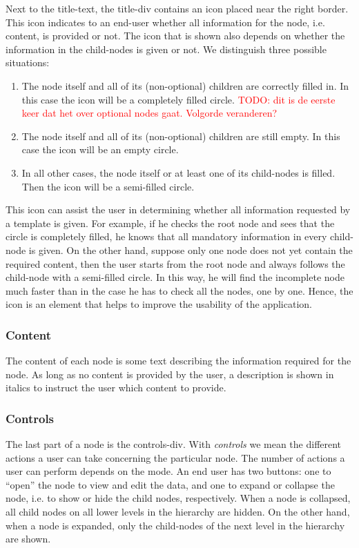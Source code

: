 Next to the title-text, the title-div contains an icon placed near the right border. This icon indicates to an end-user whether all information for the node, i.e. content, is provided or not. The icon that is shown also depends on whether the information in the child-nodes is given or not. We distinguish three possible situations:
\begin{enumerate}
	\item The node itself and all of its (non-optional) children are correctly filled in. In this case the icon will be a completely filled circle. \textcolor{red}{TODO: dit is de eerste keer dat het over optional nodes gaat. Volgorde veranderen?}
	\item The node itself and all of its (non-optional) children are still empty. In this case the icon will be an empty circle.
	\item In all other cases, the node itself or at least one of its child-nodes is filled. Then the icon will be a semi-filled circle.
\end{enumerate}
This icon can assist the user in determining whether all information requested by a template is given. For example, if he checks the root node and sees that the circle is completely filled, he knows that all mandatory information in every child-node is given. On the other hand, suppose only one node does not yet contain the required content, then the user starts from the root node and always follows the child-node with a semi-filled circle. In this way, he will find the incomplete node much faster than in the case he has to check all the nodes, one by one. Hence, the icon is an element that helps to improve the usability of the application.



\subsubsection{Content}\label{sec:content}
The content of each node is some text describing the information required for the node. As long as no content is provided by the user, a description is shown in italics to instruct the user which content to provide.



\subsubsection{Controls}\label{sec:controls}
The last part of a node is the controls-div. With \textit{controls} we mean the different actions a user can take concerning the particular node. The number of actions a user can perform depends on the mode. An end user has two buttons: one to ``open'' the node to view and edit the data, and one to expand or collapse the node, i.e. to show or hide the child nodes, respectively. When a node is collapsed, all child nodes on all lower levels in the hierarchy are hidden. On the other hand, when a node is expanded, only the child-nodes of the next level in the hierarchy are shown.\\

